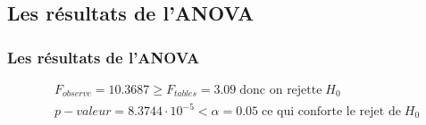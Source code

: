 \documentclass{beamer}
\begin{document}
\subsection{Les résultats de l'ANOVA}
\begin{frame}
\frametitle{Les résultats de l'ANOVA}

\begin{align*}
& F_{observe} = 10.3687 \ge F_{tables}=3.09 \; \text{donc on rejette} \; H_0 \\
& p-valeur=8.3744 \cdot 10^{-5} < \alpha=0.05 \; \text{ce qui conforte le rejet de} \; H_0 
\end{align*}

\begin{figure}[H]
\end{figure}
\end{frame}
\end{document}
